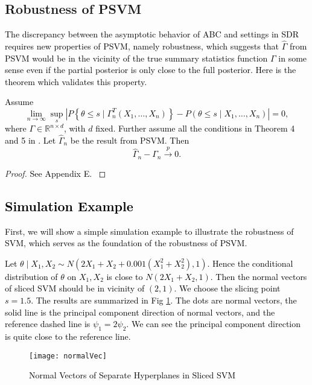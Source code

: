 \subsection{Robustness of PSVM}

\textcolor{black}{The discrepancy between the asymptotic behavior
of ABC and settings in SDR requires new properties of PSVM, namely
robustness, which suggests that $\hat{\Gamma}$ from PSVM would be
in the vicinity of the true summary statistics function $\Gamma$
in some sense even if the partial posterior is only close to the full
posterior. Here is the theorem which validates this property.}
\begin{theorem}
\textcolor{black}{\label{thm:robust-psvm} Assume 
\[
\lim_{n\rightarrow\infty}\sup_{s}\left|P\left\{ \theta\le s\mid\Gamma_{n}^{T}\left(X_{1},\ldots,X_{n}\right)\right\} -P\left(\theta\le s\mid X_{1},\ldots,X_{n}\right)\right|=0,
\]
where $\Gamma\in\mathbb{R}^{n\times d}$, with $d$ fixed. Further
assume all the conditions in Theorem 4 and 5 in \cite{li2011principal}. Let $\hat{\Gamma}_{n}$
be the result from PSVM. Then 
\[
\hat{\Gamma}_{n}-\Gamma_{n}\overset{p}{\rightarrow}0.
\]
}\end{theorem}
\begin{proof}
\textcolor{black}{See Appendix E. }
\end{proof}

\subsection{\textcolor{black}{Simulation Example }}

\textcolor{black}{First, we will show a simple simulation example
to illustrate the robustness of SVM, which serves as the foundation
of the robustness of PSVM.}
\begin{example}
\textcolor{black}{Let $\theta\mid X_{1},X_{2}\sim N\left(2X_{1}+X_{2}+0.001\left(X_{1}^{2}+X_{2}^{2}\right),1\right)$.
Hence the conditional distribution of $\theta$ on $X_{1},X_{2}$
is close to $N\left(2X_{1}+X_{2},1\right)$. Then the normal vectors
of sliced SVM should be in vicinity of $\left(2,1\right)$. We choose
the slicing point $s=1.5$. The results are summarized in Fig \ref{fig:Normal-Vectors-sliced-svm}.
The dots are normal vectors, the solid line is the principal component
direction of normal vectors, and the reference dashed line is $\psi_{1}=2\psi_{2}$.
We can see the principal component direction is quite close to the
reference line.}

\begin{figure}
{\texttt{[image: normalVec]}\protect\caption{\textcolor{black}{Normal Vectors of Separate Hyperplanes in Sliced
SVM}\label{fig:Normal-Vectors-sliced-svm}}
}

\end{figure}

\end{example}

